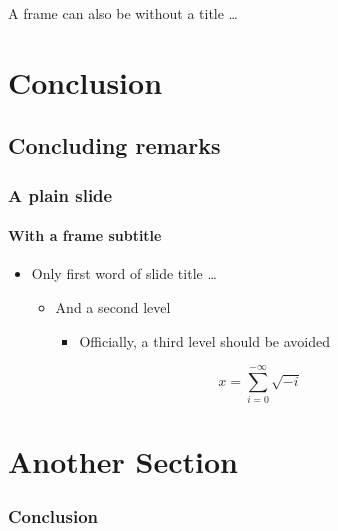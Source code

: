 \documentclass[%
 titlelight
 ,aspectratio=169,classification=public-cc-by]{lh-presentation}
\begin{document}
\begin{frame}
A frame can also be without a title \ldots
\end{frame}

\section{Conclusion}
\subsection{Concluding remarks}

\frame{\sectionpage}

\begin{frame}[plain,classification=confidential]
  \frametitle{A plain slide}
  \framesubtitle{With a frame subtitle}


  \begin{itemize}
  \item Only first word of slide title \ldots
    \begin{itemize}
    \item  And a second level 
      \begin{itemize}
      \item  Officially, a third level should be avoided
      \end{itemize}
    \end{itemize}
  \end{itemize}
  \[ x = \sum_{i=0}^{-\infty}\sqrt{-i}\]
\end{frame}

\ThanksFrame
\KeyTakeAwayFrame{
\begin{itemize}
\item \ldots
\item \ldots
\item \ldots
\item \ldots
\end{itemize}
}
\CopyrightFrame
{}

\section{Another Section}
\frame{\sectionpage}
\begin{frame}
\frametitle{Conclusion}
\end{frame}
\end{document}
